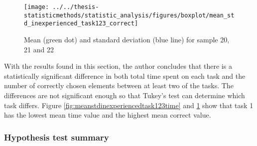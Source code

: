 \begin{figure}[H]
	\centering
	\texttt{[image: ../../thesis-statisticmethods/statistic\_analysis/figures/boxplot/mean\_std\_inexperienced\_task123\_correct]}
	\caption{Mean (green dot) and standard deviation (blue line) for sample 20, 21 and 22}
	\label{fig:meanstdinexperiencedtask123correct}
\end{figure}

With the results found in this section, the author concludes that there is a statistically significant difference in both total time spent on each task and the number of correctly chosen elements between at least two of the tasks. The differences are not significant enough so that Tukey's test can determine which task differs. Figure \ref{fig:meanstdinexperiencedtask123time} and \ref{fig:meanstdinexperiencedtask123correct} show that task 1 has the lowest mean time value and the highest mean correct value. 

\subsubsection{Hypothesis test summary}

